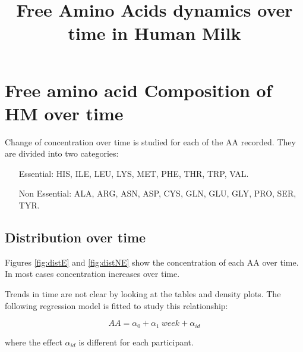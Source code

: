\documentclass[12pt]{article}
\title{Free Amino Acids dynamics over time in Human Milk}
\begin{document}
\maketitle

\begin{abstract}
\end{abstract}

\section{Free amino acid Composition of HM over time}

Change of concentration over time is studied for each of the AA recorded. They are divided into two categories:

\begin{itemize}
  \item[Essential:] HIS, ILE, LEU, LYS, MET, PHE, THR, TRP, VAL.
  \item[Non Essential:] ALA, ARG, ASN, ASP, CYS, GLN, GLU, GLY, PRO, SER, TYR.
\end{itemize}

\subsection{Distribution over time}

Figures \ref{fig:distE} and \ref{fig:distNE} show the concentration of each AA over time. In most cases concentration increases over time.

Trends in time are not clear by looking at the tables and density plots. The following regression model is fitted to study this relationship:

\begin{equation}
  AA = \alpha_0 + \alpha_1 \ week + \alpha_{id}
\end{equation}

where the effect $\alpha_{id}$ is different for each participant.
\end{document}
